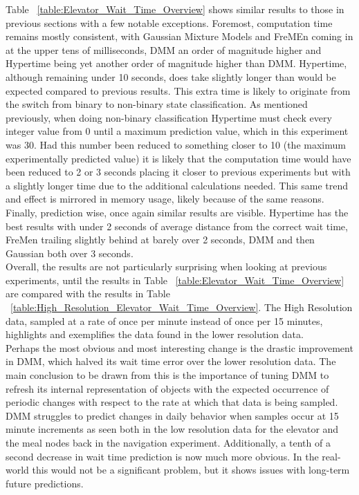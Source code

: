 Table ~\ref{table:Elevator_Wait_Time_Overview} shows similar results to those
in previous sections with a few notable exceptions. Foremost, computation time
remains mostly consistent, with Gaussian Mixture Models and FreMEn coming in at
the upper tens of milliseconds, DMM an order of magnitude higher and
Hypertime being yet another order of magnitude higher than DMM. Hypertime,
although remaining under 10 seconds, does take slightly longer than would
be expected compared to previous results. This extra time is likely to originate
from the switch from binary to non-binary state classification. As mentioned previously,
when doing non-binary classification Hypertime must check every integer value
from 0 until a maximum prediction value, which in this experiment was 30. Had this
number been reduced to something closer to 10 (the maximum experimentally
predicted value) it is likely that the computation time would have been reduced to
2 or 3 seconds placing it closer to previous
experiments but with a slightly longer time due to the additional calculations
needed. This same trend and effect is mirrored in memory usage, likely because of the same reasons.
Finally, prediction wise, once again
similar results are visible. Hypertime has the best results with under 2
seconds of average distance from the correct wait time, FreMen
trailing slightly behind at barely over 2 seconds, DMM and then Gaussian both over 3 seconds. \\

Overall, the results are not particularly surprising when looking at previous
experiments, until the results in Table
~\ref{table:Elevator_Wait_Time_Overview} are compared with the results in Table
~\ref{table:High_Resolution_Elevator_Wait_Time_Overview}. The High Resolution
data, sampled at a rate of once per minute instead of once per 15 minutes,
highlights and exemplifies the data found in the lower resolution data. \\

Perhaps the most obvious and most interesting change is the drastic improvement
in DMM, which halved its wait time error over the lower resolution data.
The main conclusion to be drawn from this is the importance of tuning DMM
to refresh its internal representation of objects with the expected occurrence
of periodic changes with respect to the rate at which that data is being
sampled. DMM struggles to predict changes in daily behavior when samples
occur at 15 minute increments as seen both in the low resolution data for the
elevator and the meal nodes back in the navigation experiment.
Additionally, a tenth of a second decrease in wait time prediction is now much more obvious.
In the real-world this would not be a significant problem,
but it shows issues with long-term future predictions. \\

